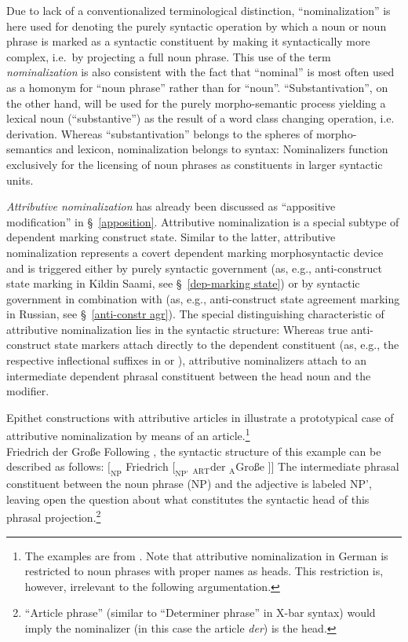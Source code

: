 Due to lack of a conventionalized terminological distinction, “nominalization” is here used for denoting the purely syntactic operation by which a noun or noun phrase is marked as a syntactic constituent by making it syntactically more complex, i.e.~by projecting a full noun phrase. This use of the term \emph{nominalization} is also consistent with the fact that “nominal” is most often used as a homonym for “noun phrase” rather than for “noun”. “Substantivation”, on the other hand, will be used for the purely morpho-semantic process yielding a lexical noun (“substantive”) as the result of a word class changing operation, i.e. derivation. Whereas “substantivation” belongs to the spheres of morpho-semantics and lexicon, nominalization belongs to syntax: Nominalizers function exclusively for the licensing of noun phrases as constituents in larger syntactic units.

\emph{Attributive nominalization} has already been discussed as “appositive modification” in \S~\ref{apposition}. Attributive nominalization is a special subtype of dependent marking construct state. Similar to the latter, attributive nominalization represents a covert dependent marking morphosyntactic device and is triggered either by purely syntactic government (as, e.g., anti\hyp{}construct state marking in Kildin Saami, see \S~\ref{dep-marking state}) or by syntactic government in combination with  (as, e.g., anti\hyp{}construct state agreement marking in Russian, see \S~\ref{anti-constr agr}). The special distinguishing characteristic of attributive nominalization lies in the syntactic structure: Whereas true anti\hyp{}construct state markers attach directly to the dependent constituent (as, e.g., the respective inflectional suffixes in  or ), attributive nominalizers attach to an intermediate dependent phrasal constituent between the head noun and the modifier.

Epithet constructions with attributive articles in  illustrate a prototypical case of attributive nominalization by means of an article.\footnote{The examples are from \citet[179–180]{himmelmann1997}. Note that attributive nominalization in German is restricted to noun phrases with proper names as heads. This restriction is, however, irrelevant to the following argumentation.}
\ea \label{german epithet}
\\
Friedrich der Große 			
\z
Following \citet[180]{himmelmann1997}, the syntactic structure of this example can be described as follows:
\ea	$[_\textrm{NP}$ Friedrich $[_\textrm{NP'}$ $_\textrm{ART}$der $_\textrm{A}$Große $] ]$
\z
The intermediate phrasal constituent between the noun phrase (NP) and the adjective is labeled NP', leaving open the question about what constitutes the syntactic head of this phrasal projection.\footnote{“Article phrase” (similar to “Determiner phrase” in X-bar syntax) would imply the nominalizer (in this case the article \textit{der}) is the head.}

